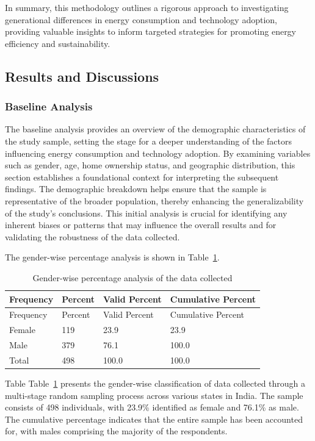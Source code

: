 \documentclass[
  letterpaper,
  DIV=11,
  numbers=noendperiod]{scrartcl}
\begin{document}
In summary, this methodology outlines a rigorous approach to
investigating generational differences in energy consumption and
technology adoption, providing valuable insights to inform targeted
strategies for promoting energy efficiency and sustainability.

\subsection{Results and Discussions}\label{results-and-discussions}

\subsubsection{Baseline Analysis}\label{baseline-analysis}

The baseline analysis provides an overview of the demographic
characteristics of the study sample, setting the stage for a deeper
understanding of the factors influencing energy consumption and
technology adoption. By examining variables such as gender, age, home
ownership status, and geographic distribution, this section establishes
a foundational context for interpreting the subsequent findings. The
demographic breakdown helps ensure that the sample is representative of
the broader population, thereby enhancing the generalizability of the
study's conclusions. This initial analysis is crucial for identifying
any inherent biases or patterns that may influence the overall results
and for validating the robustness of the data collected.

The gender-wise percentage analysis is shown in Table~\ref{tbl-gender}.

\begin{longtable}[]{@{}llll@{}}
\caption{Gender-wise percentage analysis of the data
collected}\label{tbl-gender}\tabularnewline
\toprule\noalign{}
Frequency & Percent & Valid Percent & Cumulative Percent \\
\midrule\noalign{}
\endfirsthead
\toprule\noalign{}
Frequency & Percent & Valid Percent & Cumulative Percent \\
\midrule\noalign{}
\endhead
\bottomrule\noalign{}
\endlastfoot
Female & 119 & 23.9 & 23.9 \\
Male & 379 & 76.1 & 100.0 \\
Total & 498 & 100.0 & 100.0 \\
\end{longtable}

Table Table~\ref{tbl-gender} presents the gender-wise classification of
data collected through a multi-stage random sampling process across
various states in India. The sample consists of 498 individuals, with
23.9\% identified as female and 76.1\% as male. The cumulative
percentage indicates that the entire sample has been accounted for, with
males comprising the majority of the respondents.
\end{document}
